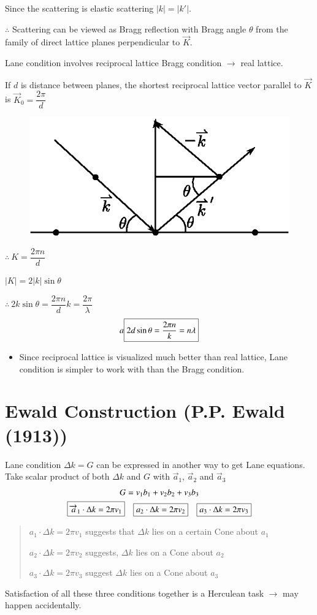 Since the scattering is elastic scattering $|k|=|k'|$.

$\therefore$ Scattering can be viewed as Bragg reflection with Bragg angle $\theta$ from the family of direct lattice planes perpendicular to $\overrightarrow{K}$.

Lane condition involves reciprocal lattice Bragg condition $\to$ real lattice.

If $d$ is distance between planes, the shortest reciprocal lattice vector parallel to $\overrightarrow{K}$ is $\overrightarrow{K}_{0}=\dfrac{2\pi}{d}$
\begin{figure}[H]
\centering
\includegraphics{images/lecture14/fig6.eps}
\end{figure}

$\therefore \ K=\dfrac{2\pi n}{d}$

$|K|=2|k|\sin \theta$

$\therefore \ 2k\sin \theta=\dfrac{2\pi n}{d}$\quad $k=\dfrac{2\pi}{\lambda}$
$$
a\fbox{$2d\sin\theta=\dfrac{2\pi n}{k}=n\lambda$}
$$
\begin{itemize}
\item Since reciprocal lattice is visualized much better than real lattice, Lane condition is simpler to work with than the Bragg condition.
\end{itemize}

\section*{Ewald Construction (P.P. Ewald (1913))}

Lane condition $\Delta k=G$ can be expressed in another way to get Lane equations. Take scalar product of both $\Delta k$ and $G$ with $\overrightarrow{a}_{1}$, $\overrightarrow{a}_{2}$ and $\overrightarrow{a}_{3}$
\begin{gather*}
G=v_{1}b_{1}+v_{2}b_{2}+v_{3}b_{3}\\
\fbox{$\overrightarrow{a}_{1}\cdot \Delta k=2\pi v_{1}$}\quad \fbox{$a_{2}\cdot \Delta k=2\pi v_{2}$}\quad \fbox{$a_{3}\cdot \Delta k=2\pi v_{3}$}
\end{gather*}
\begin{quote}
$a_{1}\cdot \Delta k=2\pi v_{1}$ suggests that $\Delta k$ lies on a certain Cone about $a_{1}$

$a_{2}\cdot \Delta k=2\pi v_{2}$ suggests, $\Delta k$ lies on a Cone about $a_{2}$

$a_{3}\cdot \Delta k=2\pi v_{3}$ suggest $\Delta k$ lies on a Cone about $a_{3}$
\end{quote}
Satisfaction of all these three conditions together is a Herculean task $\to$ may happen accidentally.


